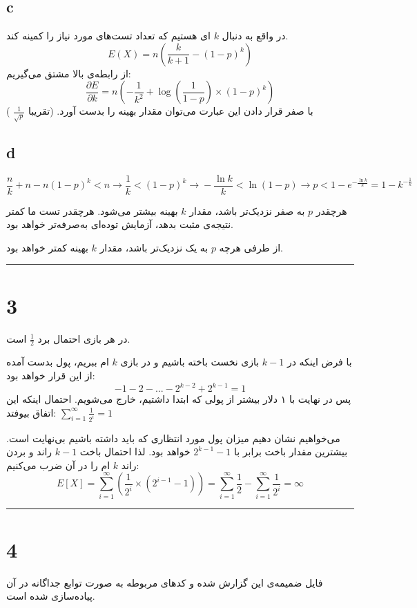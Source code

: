 \documentclass{article}
\begin{document}
\subsection*{c}
در واقع به دنبال
$k$
ای هستیم که تعداد تست‌های مورد نیاز را کمینه کند.
$$ E(X) = n \left( \frac{k}{k+1} - (1 - p)^k \right) $$
از رابطه‌ی بالا مشتق می‌گیریم:
$$\frac{\partial E}{\partial k} = n \left(- \frac{1}{k^2} + \log(\frac{1}{1-p}) \times (1-p)^k \right)$$
با صفر قرار دادن این عبارت می‌توان مقدار بهینه را بدست آورد. (تقریبا
$\frac{1}{\sqrt{p}}$
)

\subsection*{d}
$$\frac{n}{k} + n - n(1-p)^k < n \xrightarrow{} \frac{1}{k} < (1-p)^k \xrightarrow{} - \frac{\ln k}{k} < \ln(1-p) \xrightarrow{} p < 1 - e^{- \frac{\ln k}{k}} = 1 - k^{- \frac{1}{k}}$$

هرچقدر
$p$
به صفر نزدیک‌تر باشد، مقدار
$k$
بهینه بیشتر می‌شود. هرچقدر تست ما کمتر نتیجه‌ی مثبت بدهد، آزمایش توده‌ای به‌صرفه‌تر خواهد بود.

از طرفی هرچه
$p$
به یک نزدیک‌تر باشد، مقدار
$k$
بهینه کمتر خواهد بود.

\rule{\linewidth}{1pt}
\section*{3}

در هر بازی احتمال برد
$\frac{1}{2}$
است.

با فرض اینکه در
$k-1$
بازی نخست باخته باشیم و در بازی
$k$
ام ببریم، پول بدست آمده از این قرار خواهد بود:
$$-1-2-...-2^{k-2}+2^{k-1} = 1$$
پس در نهایت با ۱ دلار بیشتر از پولی که ابتدا داشتیم، خارج می‌شویم. احتمال اینکه این اتفاق بیوفتد:
$\sum^{\infty}_{i=1}\frac{1}{2^i} = 1$

می‌خواهیم نشان دهیم میزان پول مورد انتظاری که باید داشته باشیم بی‌نهایت است. بیشترین مقدار باخت برابر با
$2^{k-1} - 1$
خواهد بود. لذا احتمال باخت
$k-1$
راند و بردن راند
$k$
ام را در آن ضرب می‌کنیم:
$$E[X] = \sum^{\infty}_{i=1} \left(\frac{1}{2^i} \times \left(2^{i-1}-1\right) \right) = \sum^{\infty}_{i=1} \frac{1}{2} - \sum^{\infty}_{i=1} \frac{1}{2^i} = \infty$$
\rule{\linewidth}{1pt}

\section*{4}
فایل
ضمیمه‌ی این گزارش شده و کدهای مربوطه به صورت توابع جداگانه در آن پیاده‌سازی شده است.
\end{document}
